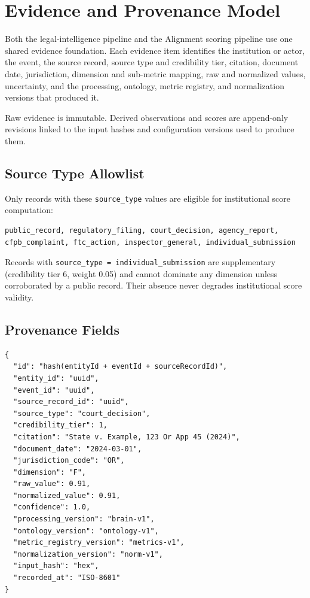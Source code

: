 \section{Evidence and Provenance Model}

Both the legal-intelligence pipeline and the Alignment scoring pipeline use
one shared evidence foundation. Each evidence item identifies the institution
or actor, the event, the source record, source type and credibility tier,
citation, document date, jurisdiction, dimension and sub-metric mapping,
raw and normalized values, uncertainty, and the processing, ontology, metric
registry, and normalization versions that produced it.

Raw evidence is immutable. Derived observations and scores are append-only
revisions linked to the input hashes and configuration versions used to
produce them.

\subsection{Source Type Allowlist}

Only records with these \texttt{source\_type} values are eligible for
institutional score computation:

\begin{lstlisting}
public_record, regulatory_filing, court_decision, agency_report,
cfpb_complaint, ftc_action, inspector_general, individual_submission
\end{lstlisting}

Records with \texttt{source\_type = individual\_submission} are supplementary
(credibility tier 6, weight 0.05) and cannot dominate any dimension unless
corroborated by a public record. Their absence never degrades institutional
score validity.

\subsection{Provenance Fields}

\begin{lstlisting}
{
  "id": "hash(entityId + eventId + sourceRecordId)",
  "entity_id": "uuid",
  "event_id": "uuid",
  "source_record_id": "uuid",
  "source_type": "court_decision",
  "credibility_tier": 1,
  "citation": "State v. Example, 123 Or App 45 (2024)",
  "document_date": "2024-03-01",
  "jurisdiction_code": "OR",
  "dimension": "F",
  "raw_value": 0.91,
  "normalized_value": 0.91,
  "confidence": 1.0,
  "processing_version": "brain-v1",
  "ontology_version": "ontology-v1",
  "metric_registry_version": "metrics-v1",
  "normalization_version": "norm-v1",
  "input_hash": "hex",
  "recorded_at": "ISO-8601"
}
\end{lstlisting}
